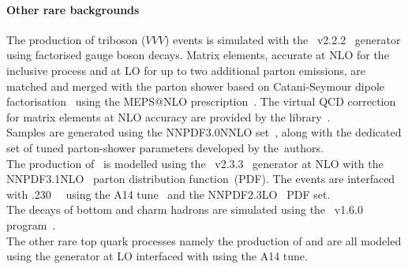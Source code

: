 \paragraph{Other rare backgrounds}
The production of triboson ($VVV$) events is simulated with the 
\sherpa~v2.2.2~\cite{Bothmann:2019yzt} generator using factorised gauge boson decays. 
Matrix elements, accurate at NLO for the inclusive process and at LO for up to 
two additional parton emissions, are matched and merged with the \sherpa parton 
shower based on Catani-Seymour dipole factorisation~\cite{Gleisberg:2008fv,Schumann:2007mg} 
using the MEPS@NLO prescription~\cite{Hoeche:2011fd,Hoeche:2012yf,Catani:2001cc,Hoeche:2009rj}. 
The virtual QCD correction for matrix elements at NLO accuracy are 
provided by the \openloops library~\cite{Cascioli:2011va,Denner:2016kdg}.\\
Samples are generated using the \textsc{NNPDF3.0NNLO} set~\cite{Ball:2014uwa}, along with
the dedicated set of tuned parton-shower parameters developed by the~\sherpa authors.\\
The production of \tttt\ is modelled using the \mgamc~v2.3.3~\cite{Alwall:2014hca}
generator at NLO with the \textsc{NNPDF3.1NLO}~\cite{Ball:2014uwa} parton distribution function~(PDF).
The events are interfaced with \pythia.230~\cite{Sjostrand:2014zea}~ using the A14 tune~\cite{ATL-PHYS-PUB-2014-021} and the
\textsc{NNPDF2.3LO}~\cite{Ball:2014uwa} PDF set.\\
The decays of bottom and charm hadrons are simulated using the \evtgen\ v1.6.0 program~\cite{Lange:2001uf}. \\
The other rare top quark processes namely the production of \ttWW and \ttt are all modeled using the \mgamc generator at LO interfaced with \pythia using the A14 tune.
